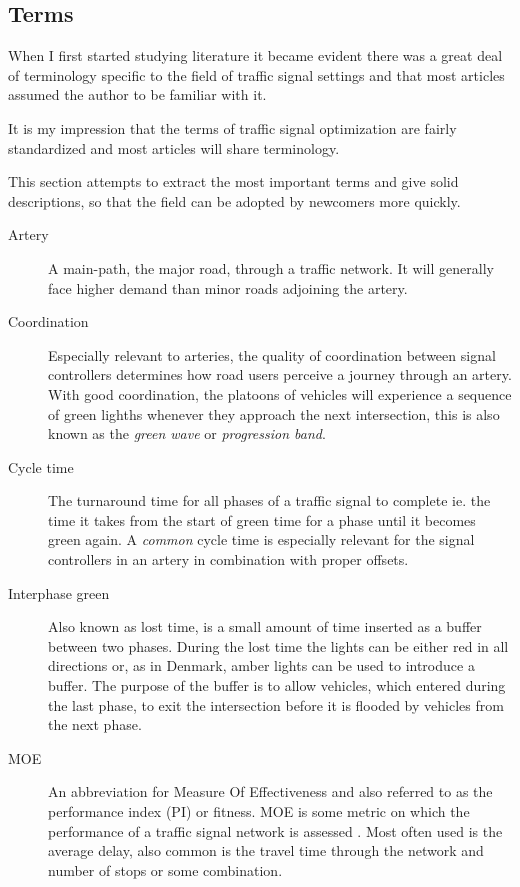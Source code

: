 \subsection{Terms}
\label{vocabulary}
When I first started studying literature \cite{forprojekt} it became evident there was a great deal of terminology specific to the field of traffic signal settings and that most articles assumed the author to be familiar with it. 

It is my impression that the terms of traffic signal optimization are fairly standardized and most articles will share terminology.

This section attempts to extract the most important terms and give solid descriptions, so that the field can be adopted by newcomers more quickly.

\begin{description}

\item[Artery] A main-path, the major road, through a traffic network. It will generally face higher demand than minor roads adjoining the artery.
			
\item[Coordination] Especially relevant to arteries, the quality of coordination between signal controllers determines how road users perceive a journey through an artery. With good coordination, the platoons of vehicles will experience a sequence of green lighths whenever they approach the next intersection, this is also known as the \textit{green wave} or \textit{progression band}.
			
\item[Cycle time] The turnaround time for all phases of a traffic signal to complete ie. the time it takes from the start of green time for a phase until it becomes green again. A \textit{common} cycle time is especially relevant for the signal controllers in an artery in combination with proper offsets.

\item[Interphase green] Also known as lost time, is a small amount of time inserted as a buffer between two phases. During the lost time the lights can be either red in all directions or, as in Denmark, amber lights can be used to introduce a buffer. The purpose of the buffer is to allow vehicles, which entered during the last phase, to exit the intersection before it is flooded by vehicles from the next phase.

\item[MOE] An abbreviation for Measure Of Effectiveness and also referred to as the performance index (PI) or fitness. MOE is some metric on which the performance of a traffic signal network is assessed .
	Most often used is the average delay, also common is the travel time through the network and number of stops or some combination.
	

\end{description}

